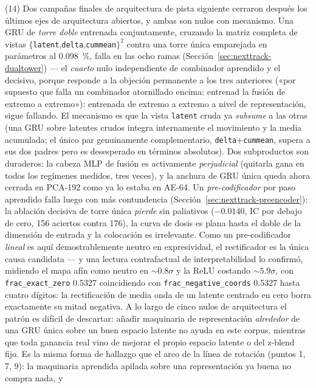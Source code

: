 \documentclass[11pt]{article}
\begin{document}
(14) Dos campañas finales de arquitectura de pista siguiente cerraron después los
últimos ejes de arquitectura abiertos, y ambas son nulos con mecanismo. Una GRU de
\emph{torre doble} entrenada conjuntamente, cruzando la matriz completa de vistas
$\{$\texttt{latent},\texttt{delta},\texttt{cummean}$\}^2$ contra una torre única
emparejada en parámetros al \SI{0.098}{\percent}, falla en las ocho ramas
(Sección~\ref{sec:nexttrack-dualtower}) --- el \emph{cuarto} nulo independiente
de combinador aprendido y el decisivo, porque responde a la objeción permanente a
los tres anteriores («por supuesto que falla un combinador atornillado encima:
entrenad la fusión de extremo a extremo»): entrenada de extremo a extremo a nivel
de representación, sigue fallando. El mecanismo es que la vista \texttt{latent}
cruda ya \emph{subsume} a las otras (una GRU sobre latentes crudos integra
internamente el movimiento y la media acumulada; el único par genuinamente
complementario, \texttt{delta}$+$\texttt{cummean}, supera a sus dos padres pero es
desesperado en términos absolutos). Dos subproductos son duraderos: la cabeza MLP
de fusión es activamente \emph{perjudicial} (quitarla gana en todos los regímenes
medidos, tres veces), y la anchura de GRU única queda ahora cerrada en PCA-192
como ya lo estaba en AE-64. Un \emph{pre-codificador} por paso aprendido falla
luego con más contundencia (Sección~\ref{sec:nexttrack-preencoder}): la ablación
decisiva de torre única \emph{pierde} sin paliativos ($-\num{0.0140}$, IC por
debajo de cero, \num{156} aciertos contra \num{176}), la curva de dosis es plana
hasta el doble de la dimensión de entrada y la colocación es irrelevante. Como un
pre-codificador \emph{lineal} es aquí demostrablemente neutro en expresividad, el
rectificador es la única causa candidata --- y una lectura contrafactual de
interpretabilidad lo confirmó, midiendo el mapa afín como neutro en
${\sim}0.8\sigma$ y la ReLU costando ${\sim}5.9\sigma$, con
\texttt{frac\_exact\_zero} \num{0.5327} coincidiendo con
\texttt{frac\_negative\_coords} \num{0.5327} hasta cuatro dígitos: la
rectificación de media onda de un latente centrado en cero borra exactamente su
mitad negativa. A lo largo de cinco nulos de arquitectura el patrón es difícil de
descartar: añadir maquinaria de representación \emph{alrededor} de una GRU única
sobre un buen espacio latente no ayuda en este corpus, mientras que toda ganancia
real vino de mejorar el propio espacio latente o del z-blend fijo. Es la misma
forma de hallazgo que el arco de la línea de rotación (puntos 1, 7, 9): la
maquinaria aprendida apilada sobre una representación ya buena no compra nada, y
\end{document}
